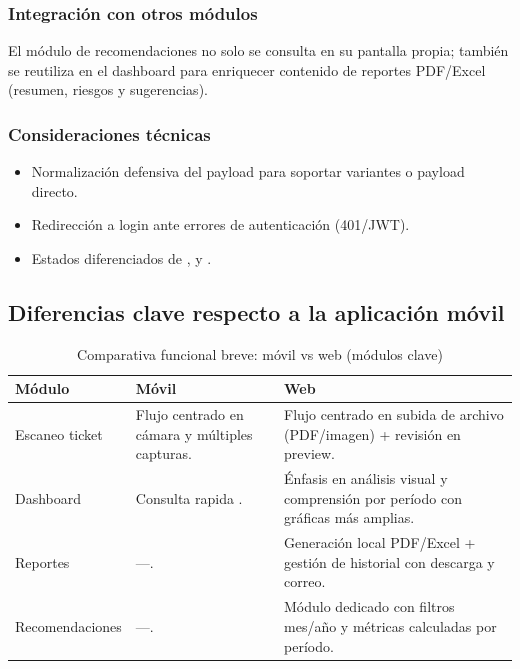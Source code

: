 \subsubsection{Integración con otros módulos}

El módulo de recomendaciones no solo se consulta en su pantalla propia;
también se reutiliza en el dashboard para enriquecer contenido de reportes
PDF/Excel (resumen, riesgos y sugerencias).

\subsubsection{Consideraciones técnicas}

\begin{itemize}
  \item Normalización defensiva del payload para soportar variantes
         o payload directo.
  \item Redirección a login ante errores de autenticación (401/JWT).
  \item Estados diferenciados de ,  y .
\end{itemize}


\subsection{Diferencias clave respecto a la aplicación móvil}

\begin{table}[H]
  \centering
  \caption{Comparativa funcional breve: móvil vs web (módulos clave)}
  \label{tab:comparativa-web-movil}
  \begin{tabular}{p{3.2cm}p{4.8cm}p{4.8cm}}
    \toprule
    \textbf{Módulo} & \textbf{Móvil} & \textbf{Web} \\
    \midrule
    Escaneo ticket & Flujo centrado en cámara y múltiples capturas. & Flujo centrado en subida de archivo (PDF/imagen) + revisión en preview. \\
    Dashboard & Consulta rapida . & Énfasis en análisis visual y comprensión por período con gráficas más amplias. \\
    Reportes & ---. & Generación local PDF/Excel + gestión de historial con descarga y correo. \\
    Recomendaciones & ---. & Módulo dedicado con filtros mes/año y métricas calculadas por período. \\
    \bottomrule
  \end{tabular}
\end{table}


